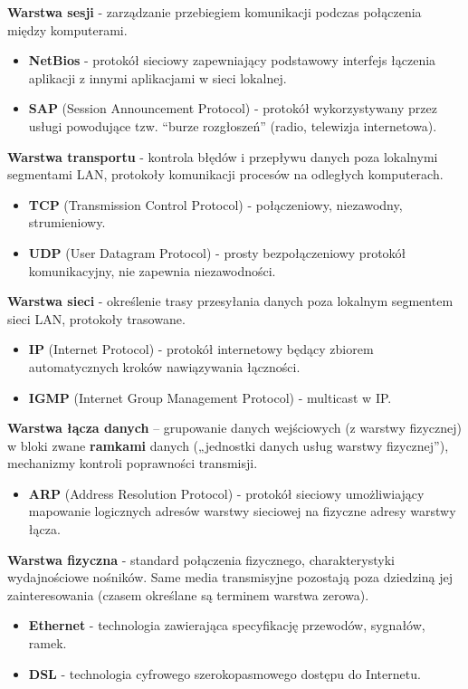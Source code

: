 \documentclass[main.tex]{subfiles}
\begin{document}
    \noindent \textbf{Warstwa sesji} - zarządzanie przebiegiem komunikacji podczas
    połączenia między komputerami.
    \begin{itemize}[noitemsep]
        \item \textbf{NetBios} - protokół sieciowy zapewniający podstawowy interfejs
        łączenia aplikacji z innymi aplikacjami w sieci lokalnej.
        \item \textbf{SAP} (Session Announcement Protocol) - protokół wykorzystywany przez usługi powodujące tzw.
        ``burze rozgłoszeń'' (radio, telewizja internetowa).
    \end{itemize}

    \noindent \textbf{Warstwa transportu} - kontrola błędów i przepływu danych
    poza lokalnymi segmentami LAN, protokoły komunikacji procesów na odległych komputerach.
    \begin{itemize}[noitemsep]
        \item \textbf{TCP} (Transmission Control Protocol) - połączeniowy, niezawodny, strumieniowy.
        \item \textbf{UDP} (User Datagram Protocol) - prosty bezpołączeniowy protokół komunikacyjny, nie zapewnia
        niezawodności.
    \end{itemize}

    \noindent \textbf{Warstwa sieci} - określenie trasy przesyłania danych poza lokalnym segmentem sieci LAN,
    protokoły trasowane.
    \begin{itemize}[noitemsep]
        \item \textbf{IP} (Internet Protocol) - protokół internetowy będący zbiorem automatycznych kroków
        nawiązywania łączności.
        \item \textbf{IGMP} (Internet Group Management Protocol) - multicast w IP.
    \end{itemize}

    \noindent \textbf{Warstwa łącza danych} – grupowanie danych wejściowych (z warstwy fizycznej) w bloki zwane
    \textbf{ramkami} danych („jednostki danych usług warstwy fizycznej”), mechanizmy kontroli poprawności
    transmisji.
    \begin{itemize}[noitemsep]
        \item \textbf{ARP} (Address Resolution Protocol) - protokół sieciowy umożliwiający mapowanie logicznych
        adresów warstwy sieciowej na fizyczne adresy warstwy łącza.
    \end{itemize}

    \noindent \textbf{Warstwa fizyczna} - standard połączenia fizycznego, charakterystyki wydajnościowe nośników.
    Same media transmisyjne pozostają poza dziedziną jej zainteresowania (czasem określane są terminem warstwa zerowa).
    \begin{itemize}[noitemsep]
        \item \textbf{Ethernet} - technologia zawierająca specyfikację przewodów, sygnałów, ramek.
        \item \textbf{DSL} - technologia cyfrowego szerokopasmowego dostępu do Internetu.
    \end{itemize}
\end{document}
